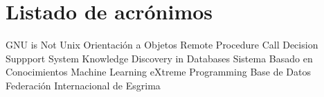 \chapter{Listado de acrónimos}

{\small
\begin{acronym}[XXXXXXXX]
       {\acs{GNU} is Not Unix}
        {Orientación a Objetos}
       {Remote Procedure Call}
       {Decision Suppport System}
       {Knowledge Discovery in Databases}
       {Sistema Basado en Conocimientos}
        {Machine Learning}
        {eXtreme Programming}
      {Base de Datos}
       {Federación Internacional de Esgrima}
\end{acronym}
}




